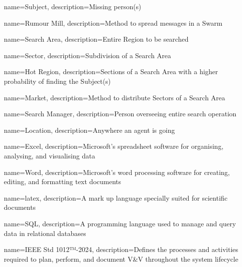 %

\glstoctrue
\makeglossaries

{
        name=Subject,
        description={Missing person(s)}
}

{
        name=Rumour Mill,
        description={Method to spread messages in a Swarm}
}

{
        name=Search Area,
        description={Entire Region to be searched}
}

{
        name=Sector,
        description={Subdivision of a Search Area}
}

{
        name=Hot Region,
        description={Sections of a Search Area with a higher probability of finding the Subject(s)}
}

{
        name=Market,
        description={Method to distribute Sectors of a Search Area}
}

{
        name=Search Manager,
        description={Person overseeing entire search operation}
}

{
        name=Location,
        description={Anywhere an agent is going}
}


{
        name=Excel,
        description={Microsoft’s spreadsheet software for organising, analysing, and visualising data}
}

{
        name=Word,
        description={Microsoft’s word processing software for creating, editing, and formatting text documents}
}

{
        name=latex,
        description={A mark up language specially suited for scientific documents}
}

{
        name=SQL,
        description={A programming language used to manage and query data in relational databases}
}


{
        name=IEEE Std 1012™-2024,
        description={Defines the processes and activities required to plan, perform, and document V\&V throughout the system lifecycle}
}

